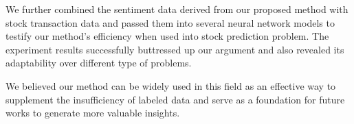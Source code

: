 \documentclass[runningheads]{llncs}
\begin{document}
We further combined the sentiment data derived from our proposed method with stock transaction data and passed them into several neural network models to testify our method’s efficiency when used into stock prediction problem. The experiment results successfully buttressed up our argument and also revealed its adaptability over different type of problems. 

We believed our method can be widely used in this field as an effective way to supplement the insufficiency of labeled data and serve as a foundation for future works to generate more valuable insights.




%
%
%
% 
% 
%
\end{document}
